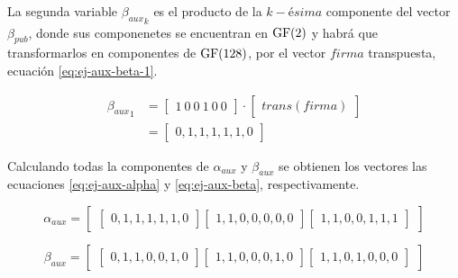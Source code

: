 La segunda variable ${\beta_{aux}}_k$ es el producto de la $k-ésima$ componente del vector $\beta_{pub}$, donde sus componenetes se encuentran en $\operatorname{GF}(2)$ y habrá que transformarlos en componentes de $\operatorname{GF}(128)$, por el vector $firma$ transpuesta, ecuación \ref{eq:ej-aux-beta-1}.

\begin{equation}\label{eq:ej-aux-beta-1}
	\begin{aligned}
	{{\beta_{aux}}_1} & = 
		\left[\begin{array}{c}1\ 0\ 0\ 1\ 0\ 0\end{array}\right]
		\cdot \left[\begin{array}{c}trans\left(firma\right)\end{array}\right]\\
		& = \left[\begin{array}{c}0, 1, 1, 1, 1, 1, 0\end{array}\right]
	\end{aligned}
\end{equation}

Calculando todas la componentes de $\alpha_{aux}$ y $\beta_{aux}$ se obtienen los vectores las ecuaciones \ref{eq:ej-aux-alpha} y \ref{eq:ej-aux-beta}, respectivamente.

\begin{equation}\label{eq:ej-aux-alpha}
	{\alpha_{aux}} = \left[\begin{array}{c}
		\left[\begin{array}{c}0, 1, 1, 1, 1, 1, 0\end{array}\right]
		\left[\begin{array}{c}1, 1, 0, 0, 0, 0, 0\end{array}\right]
		\left[\begin{array}{c}1, 1, 0, 0, 1, 1, 1\end{array}\right]
		\end{array}\right]
\end{equation}

\begin{equation}\label{eq:ej-aux-beta}
	{\beta_{aux}} =
		\left[\begin{array}{c}
			\left[\begin{array}{c}0, 1, 1, 0, 0, 1, 0\end{array}\right]		
			\left[\begin{array}{c}1, 1, 0, 0, 0, 1, 0\end{array}\right]
			\left[\begin{array}{c}1, 1, 0, 1, 0, 0, 0\end{array}\right]
		\end{array}\right]
\end{equation}

